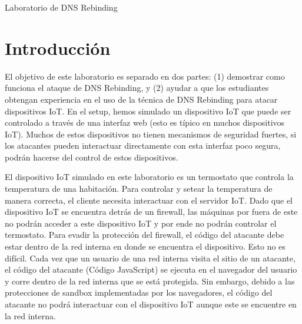 
\newcommand{\commonfolder}{../../common-files}




\newcommand{\rebindingFigs}{./Figs}





\begin{center}
{\LARGE  Laboratorio de DNS Rebinding}
\end{center}



\setcounter{task}{1}
\newcommand{\tasks} {\bf {\noindent (\arabic{task})} \addtocounter{task}{1} \,}



\section{Introducción}

El objetivo de este laboratorio es separado en dos partes: (1) demostrar como funciona el ataque de DNS Rebinding, y (2) ayudar a que los estudiantes obtengan experiencia en el uso de la técnica de DNS Rebinding para atacar dispositivos IoT. En el setup, hemos simulado un dispositivo IoT que puede ser controlado a través de una interfaz web (esto es típico en muchos dispositivos IoT). Muchos de estos dispositivos no tienen mecanismos de seguridad fuertes, si los atacantes pueden interactuar directamente con esta interfaz poco segura, podrán hacerse del control de estos dispositivos.

El dispositivo IoT simulado en este laboratorio es un termostato que controla la temperatura de una habitación.
Para controlar y setear la temperatura de manera correcta, el cliente necesita interactuar con el servidor IoT. Dado que el dispositivo IoT se encuentra detrás de un firewall, las máquinas por fuera de este no podrán acceder a este dispositivo IoT y por ende no podrán controlar el termostato. Para evadir la protección del firewall, el código del atacante debe estar dentro de la red interna en donde se encuentra el dispositivo. Esto no es difícil. Cada vez que un usuario de una red interna visita el sitio de un atacante, el código del atacante (Código JavaScript) se ejecuta en el navegador del usuario y corre dentro de la red interna que se está protegida. Sin embargo, debido a las protecciones de sandbox implementadas por los navegadores, el código del atacante no podrá interactuar con el dispositivo IoT aunque este se encuentre en la red interna.

